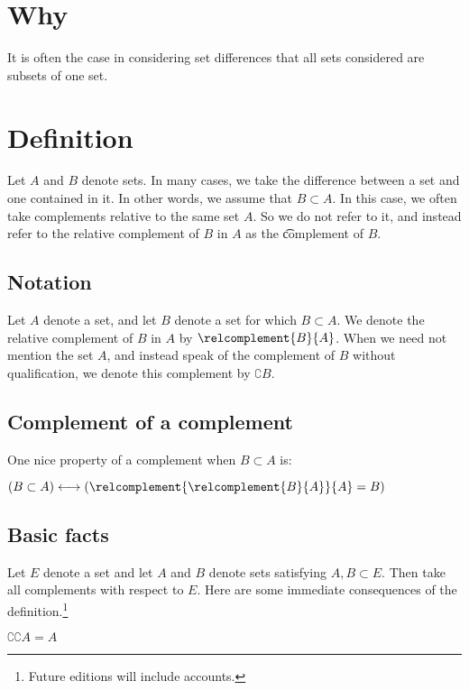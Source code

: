
\section*{Why}

It is often the case in considering set differences that all sets considered are subsets of one set.

\section*{Definition}

Let $A$ and $B$ denote sets.
In many cases, we take the difference between a set and one contained in it.
In other words, we assume that $B \subset A$.
In this case, we often take complements relative to the same set $A$.
So we do not refer to it, and instead refer to the relative complement of $B$ in $A$ as the \t{complement} of $B$.

\subsection*{Notation}

Let $A$ denote a set, and let $B$ denote a set for which $B \subset A$.
We denote the relative complement of $B$ in $A$ by $\relcomplement{B}{A}$.
When we need not mention the set $A$, and instead speak of the complement of $B$ without qualification, we denote this complement by $\complement{B}$.

\subsection*{Complement of a complement}

One nice property of a complement when $B \subset A$ is:
\begin{proposition}
$(B \subset A) \iff (\relcomplement{\relcomplement{B}{A}}{A} = B)$
\end{proposition}


\subsection*{Basic facts}

Let $E$ denote a set and let $A$ and $B$ denote sets satisfying $A,B \subset E$.
Then take all complements with respect to $E$.
Here are some immediate consequences of the definition.\footnote{Future editions will include accounts.}

\begin{proposition}
$\complement{\complement{A}} = A$
\end{proposition}

